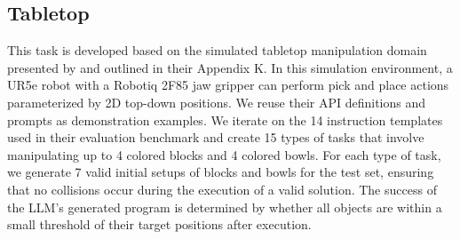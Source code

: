 \subsection{Tabletop}

This task is developed based on the simulated tabletop manipulation domain presented by \cite{liang2023code} and outlined in their Appendix K. In this simulation environment, a UR5e robot with a Robotiq 2F85 jaw gripper can perform pick and place actions parameterized by 2D top-down positions. We reuse their API definitions and prompts as demonstration examples. We iterate on the 14 instruction templates used in their evaluation benchmark and create 15 types of tasks that involve manipulating up to 4 colored blocks and 4 colored bowls. For each type of task, we generate 7 valid initial setups of blocks and bowls for the test set, ensuring that no collisions occur during the execution of a valid solution. The success of the LLM’s generated program is determined by whether all objects are within a small threshold of their target positions after execution. 
